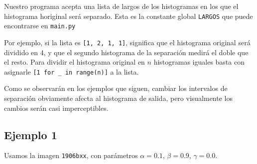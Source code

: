 Nuestro programa acepta una lista de largos de los histogramas en los que el histograma horiginal será separado.
Esta es la constante global \texttt{LARGOS} que puede encontrarse en \texttt{main.py}

Por ejemplo, si la lista es \texttt{[1, 2, 1, 1]}, significa que el histograma original será dividido en 4,
y que el segundo histograma de la separación medirá el doble que el resto.
Para dividir el histograma original en $n$ histogramas iguales basta con asignarle \texttt{[1 for \_ in range(n)]}
a la lista.

Como se observarán en los ejemplos que siguen, cambiar los intervalos de separación obviamente afecta
al histograma de salida, pero visualmente los cambios serán casi imperceptibles.

\subsection{Ejemplo 1}
Usamos la imagen \texttt{1906bxx}, con parámetros $\alpha = 0.1$, $\beta = 0.9$, $\gamma = 0.0$.

